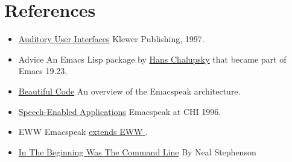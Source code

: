 \documentclass[11pt]{article}
\begin{document}
\section{References}
\label{sec-17}

\begin{itemize}
\item \href{http://emacspeak.sourceforge.net/raman/aui/aui.html}{Auditory User Interfaces}   Klewer Publishing, 1997.
\item Advice      An Emacs Lisp package by    \href{http://www.isi.edu/~hans/}{Hans Chalupsky} that
became part of Emacs 19.23.
\item \href{http://emacspeak.blogspot.com/2007/07/emacspeak-and-beautiful-code.html}{Beautiful Code}   An overview of the Emacspeak architecture.
\item \href{http://emacspeak.sourceforge.net/raman/publications/chi96-emacspeak/}{Speech-Enabled Applications}   Emacspeak at CHI 1996.
\item EWW   Emacspeak  \href{http://emacspeak.blogspot.com/2014/05/emacspeak-eww-updates-for-complete.html}{extends EWW }.
\item \href{http://artlung.com/smorgasborg/C_R_Y_P_T_O_N_O_M_I_C_O_N.shtml}{In The Beginning Was The Command Line} By Neal Stephenson
\end{itemize}
\end{document}
